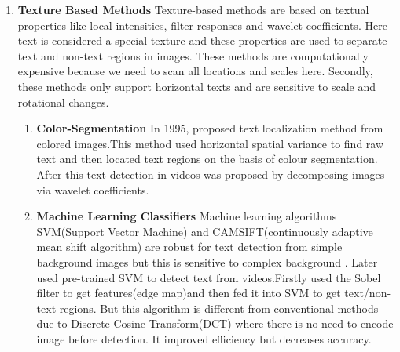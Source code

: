 \begin{enumerate}
     Text non-text separation method started in 1980 authors \cite{matching} developed combined symbol matching (CSM) system where they recognized characters by assigning certain ASCII codes. This system was sensitive to character font size and font style. For every change in font style and font size change system has to run once with different parameters. \cite{block-segmentation} algorithms were designed to classify text and graphics regions. \cite{gray-level} In 1984, the author proposed a method for extracting lines from grey-scale images of industrial design. Here algorithm is document specific too which only processes grey-scale images. \cite{electrical-segmentation} This paper used segmentation to divide electrical schematics into primary components. But this algorithm is also sensitive to changes in text size and font style. As this algorithm breaks components into sub-components so graphic recognition becomes a difficult task. Many other other authors also tried to apply this method and text/non text separation method keeps improving in preceding years \cite{robust-1999} \cite{text-finder} \cite{text-in-images}. 
    \item \textbf{Texture Based Methods} \newline
      Texture-based methods \cite{detection-advancements} are based on textual properties like local intensities, filter responses and wavelet coefficients. Here text is considered a special texture and these properties are used to separate text and non-text regions in images. These methods are computationally expensive because we need to scan all locations and scales here. Secondly, these methods only support horizontal texts and are sensitive to scale and rotational changes.
     \begin{enumerate}
        \item \textbf{Color-Segmentation}  
          In 1995, \cite{color-images} proposed text localization method from colored images.This method used horizontal spatial variance to find raw text and then located text regions on the basis of colour segmentation. After this text detection in videos was proposed by decomposing images via wavelet coefficients\cite{video-detection}. 
        \item \textbf{Machine Learning Classifiers}  
          Machine learning algorithms SVM(Support Vector Machine) and CAMSIFT(continuously adaptive mean shift algorithm) are robust for text detection from simple background images but this is sensitive to complex background \cite{CamSIFT}. Later \cite{video-svm} used pre-trained SVM to detect text from videos.Firstly used the Sobel filter to get features(edge map)and then fed it into SVM to get text/non-text regions. But this algorithm is different from conventional methods due to Discrete Cosine Transform(DCT) where there is no need to encode image before detection. It improved efficiency but decreases accuracy.

\end{enumerate}
\end{enumerate}

